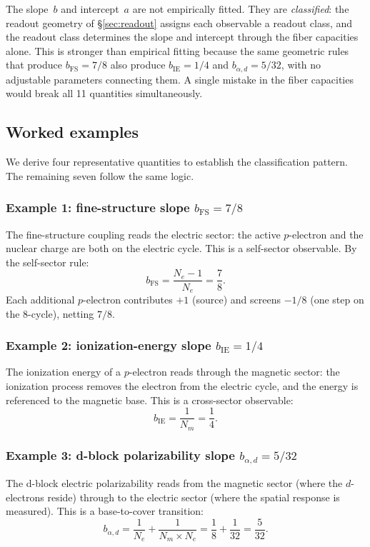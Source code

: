 \documentclass[11pt,a4paper]{article}
\begin{document}
The slope~$b$ and intercept~$a$ are not empirically fitted. They are \emph{classified}: the readout geometry of \S\ref{sec:readout} assigns each observable a readout class, and the readout class determines the slope and intercept through the fiber capacities alone. This is stronger than empirical fitting because the same geometric rules that produce $b_{\mathrm{FS}} = 7/8$ also produce $b_{\mathrm{IE}} = 1/4$ and $b_{\alpha,d} = 5/32$, with no adjustable parameters connecting them. A single mistake in the fiber capacities would break all 11 quantities simultaneously.

\subsection{Worked examples}

We derive four representative quantities to establish the classification pattern. The remaining seven follow the same logic.

\subsubsection*{Example 1: fine-structure slope $b_{\mathrm{FS}} = 7/8$}

The fine-structure coupling reads the electric sector: the active $p$-electron and the nuclear charge are both on the electric cycle. This is a self-sector observable. By the self-sector rule:
\[
b_{\mathrm{FS}} = \frac{N_e - 1}{N_e} = \frac{7}{8}.
\]
Each additional $p$-electron contributes $+1$ (source) and screens $-1/8$ (one step on the 8-cycle), netting $7/8$.

\subsubsection*{Example 2: ionization-energy slope $b_{\mathrm{IE}} = 1/4$}

The ionization energy of a $p$-electron reads through the magnetic sector: the ionization process removes the electron from the electric cycle, and the energy is referenced to the magnetic base. This is a cross-sector observable:
\[
b_{\mathrm{IE}} = \frac{1}{N_m} = \frac{1}{4}.
\]

\subsubsection*{Example 3: d-block polarizability slope $b_{\alpha,d} = 5/32$}

The d-block electric polarizability reads from the magnetic sector (where the $d$-electrons reside) through to the electric sector (where the spatial response is measured). This is a base-to-cover transition:
\[
b_{\alpha,d} = \frac{1}{N_e} + \frac{1}{N_m \times N_e} = \frac{1}{8} + \frac{1}{32} = \frac{5}{32}.
\]
\end{document}
